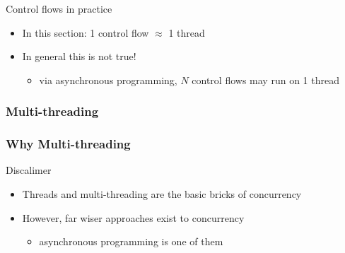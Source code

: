 \documentclass{beamer}\mode<presentation>{\usetheme{AMSBolognaFC}}
\begin{document}
\begin{frame}[allowframebreaks]
    \begin{exampleblock}{Control flows in practice}
        \begin{itemize}
            \item In this section: 1 control flow $\approx$ 1 thread
            \item In general this is not true!
            \begin{itemize}
                \item via \alert{asynchronous programming}, $N$ control flows may run on 1 thread
            \end{itemize}
        \end{itemize}
    \end{exampleblock}
\end{frame}

\subsubsection{Multi-threading}

\begin{frame}
    \frametitle{Why Multi-threading}

    \begin{alertblock}{Discalimer}
        \begin{itemize}
            \item \alert{Threads} and \alert{multi-threading}  are the basic bricks of concurrency

            \item However, far wiser approaches exist to concurrency
            \begin{itemize}
                \item \alert{asynchronous programming} is one of them
            \end{itemize}
        \end{itemize}
    \end{alertblock}

\end{frame}
\end{document}
